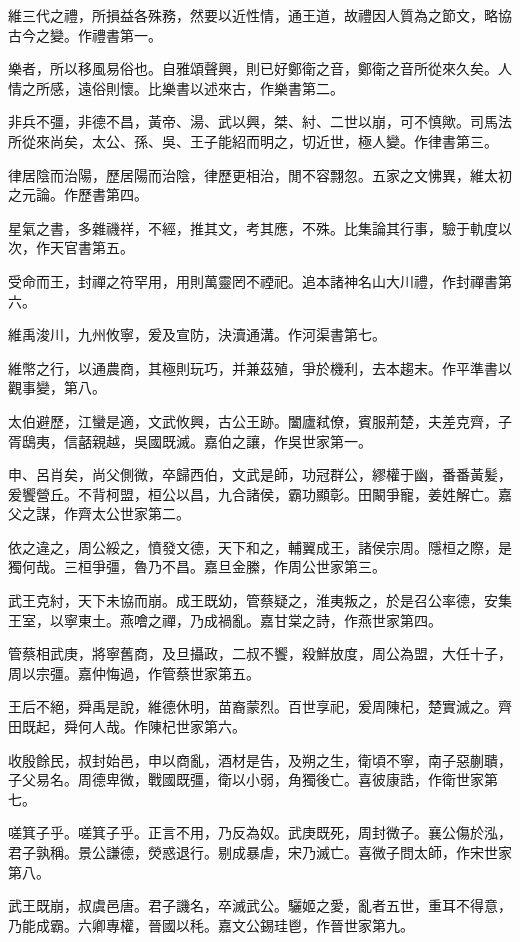 維三代之禮，所損益各殊務，然要以近性情，通王道，故禮因人質為之節文，略協古今之變。作禮書第一。

樂者，所以移風易俗也。自雅頌聲興，則已好鄭衛之音，鄭衛之音所從來久矣。人情之所感，遠俗則懷。比樂書以述來古，作樂書第二。

非兵不彊，非德不昌，黃帝、湯、武以興，桀、紂、二世以崩，可不慎歟。司馬法所從來尚矣，太公、孫、吳、王子能紹而明之，切近世，極人變。作律書第三。

律居陰而治陽，歷居陽而治陰，律歷更相治，閒不容翲忽。五家之文怫異，維太初之元論。作歷書第四。

星氣之書，多雜禨祥，不經，推其文，考其應，不殊。比集論其行事，驗于軌度以次，作天官書第五。

受命而王，封禪之符罕用，用則萬靈罔不禋祀。追本諸神名山大川禮，作封禪書第六。

維禹浚川，九州攸寧，爰及宣防，決瀆通溝。作河渠書第七。

維幣之行，以通農商，其極則玩巧，并兼茲殖，爭於機利，去本趨末。作平準書以觀事變，第八。

太伯避歷，江蠻是適，文武攸興，古公王跡。闔廬弒僚，賓服荊楚，夫差克齊，子胥鴟夷，信嚭親越，吳國既滅。嘉伯之讓，作吳世家第一。

申、呂肖矣，尚父側微，卒歸西伯，文武是師，功冠群公，繆權于幽，番番黃髪，爰饗營丘。不背柯盟，桓公以昌，九合諸侯，霸功顯彰。田闞爭寵，姜姓解亡。嘉父之謀，作齊太公世家第二。

依之違之，周公綏之，憤發文德，天下和之，輔翼成王，諸侯宗周。隱桓之際，是獨何哉。三桓爭彊，魯乃不昌。嘉旦金縢，作周公世家第三。

武王克紂，天下未協而崩。成王既幼，管蔡疑之，淮夷叛之，於是召公率德，安集王室，以寧東土。燕噲之禪，乃成禍亂。嘉甘棠之詩，作燕世家第四。

管蔡相武庚，將寧舊商，及旦攝政，二叔不饗，殺鮮放度，周公為盟，大任十子，周以宗彊。嘉仲悔過，作管蔡世家第五。

王后不絕，舜禹是說，維德休明，苗裔蒙烈。百世享祀，爰周陳杞，楚實滅之。齊田既起，舜何人哉。作陳杞世家第六。

收殷餘民，叔封始邑，申以商亂，酒材是告，及朔之生，衛頃不寧，南子惡蒯聵，子父易名。周德卑微，戰國既彊，衛以小弱，角獨後亡。喜彼康誥，作衛世家第七。

嗟箕子乎。嗟箕子乎。正言不用，乃反為奴。武庚既死，周封微子。襄公傷於泓，君子孰稱。景公謙德，熒惑退行。剔成暴虐，宋乃滅亡。喜微子問太師，作宋世家第八。

武王既崩，叔虞邑唐。君子譏名，卒滅武公。驪姬之愛，亂者五世，重耳不得意，乃能成霸。六卿專權，晉國以秏。嘉文公錫珪鬯，作晉世家第九。

